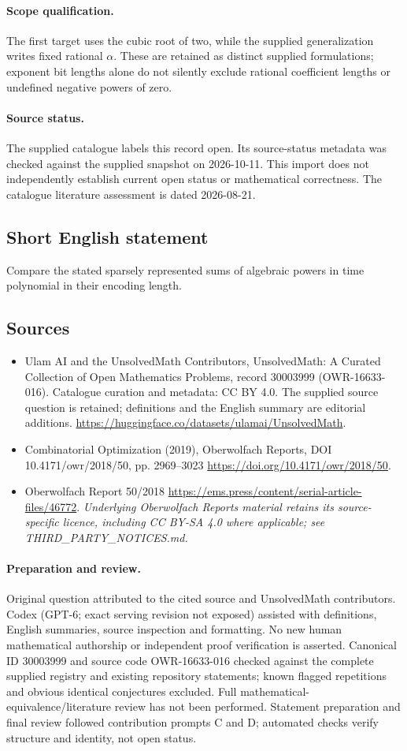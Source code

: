 \documentclass[11pt]{article}
\begin{document}
\paragraph{Scope qualification.}
The first target uses the cubic root of two, while the supplied generalization writes fixed rational $\alpha$. These are retained as distinct supplied formulations; exponent bit lengths alone do not silently exclude rational coefficient lengths or undefined negative powers of zero.
\paragraph{Source status.}
The supplied catalogue labels this record open. Its source-status metadata was checked against the supplied snapshot on 2026-10-11. This import does not independently establish current open status or mathematical correctness. The catalogue literature assessment is dated 2026-08-21.
\subsection{Short English statement}
Compare the stated sparsely represented sums of algebraic powers in time polynomial in their encoding length.
\subsection{Sources}
\begin{itemize}
\item[S1] Ulam AI and the UnsolvedMath Contributors, UnsolvedMath: A Curated Collection of Open Mathematics Problems, record 30003999 (OWR-16633-016). Catalogue curation and metadata: CC BY 4.0. The supplied source question is retained; definitions and the English summary are editorial additions.
\url{https://huggingface.co/datasets/ulamai/UnsolvedMath}.
\item[S2] Combinatorial Optimization (2019), Oberwolfach Reports, DOI 10.4171/owr/2018/50, pp. 2969--3023
\url{https://doi.org/10.4171/owr/2018/50}.
\item[S3] Oberwolfach Report 50/2018
\url{https://ems.press/content/serial-article-files/46772}.
\textit{Underlying Oberwolfach Reports material retains its source-specific licence, including CC BY-SA 4.0 where applicable; see THIRD\_PARTY\_NOTICES.md.}
\end{itemize}
\paragraph{Preparation and review.}
Original question attributed to the cited source and UnsolvedMath contributors. Codex (GPT-6; exact serving revision not exposed) assisted with definitions, English summaries, source inspection and formatting. No new human mathematical authorship or independent proof verification is asserted. Canonical ID 30003999 and source code OWR-16633-016 checked against the complete supplied registry and existing repository statements; known flagged repetitions and obvious identical conjectures excluded. Full mathematical-equivalence/literature review has not been performed. Statement preparation and final review followed contribution prompts C and D; automated checks verify structure and identity, not open status.
\label{end:30003999}
\end{document}
